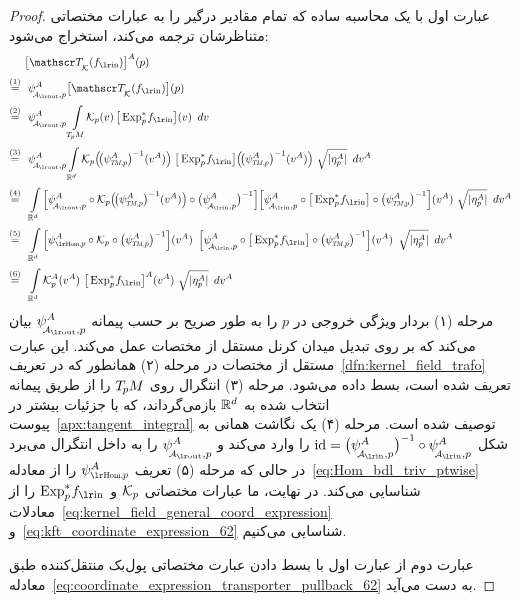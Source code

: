 \begin{proof}
    عبارت اول با یک محاسبه ساده که تمام مقادیر درگیر را به عبارات مختصاتی متناظرشان ترجمه می‌کند، استخراج می‌شود:
    \begin{align}
        & \ 
            \big[ \TK(\fin) \big]^A (p) \notag \\[.5ex]
        \overset{(1)}{=} & \ \ 
            \psiAoutp^A \big[ \TK(\fin) \big] (p) \notag \\[.5ex]
        \overset{(2)}{=} & \ \ 
            \psiAoutp^A
            \int\limits_{\TpM}\mkern-4mu
            \Kp(v) \,
            \big[\Expspfin\big] (v)
            \,\ dv
        \notag \\[.5ex]
        \overset{(3)}{=} & \ \ 
            \psiAoutp^A
            \int\limits_{\R^d}
            \Kp \pig(\! \big(\psiTMp^A\big)^{-1}(v^A) \pig) \;
            \big[\Expspfin\big] \pig(\!\big( \psiTMp^A \big)^{-1} (v^A) \pig)
            \ \sqrt{|\eta_p^A|}\,\ dv^A
        \notag \\[.5ex]
        \overset{(4)}{=} & \ \ 
            \int\limits_{\R^d}
            \Big[ \psiAoutp^A \circ
            \Kp \pig(\! \big(\psiTMp^A\big)^{-1}(v^A) \pig) \circ
            \big( \psiAinp^A \big)^{-1} \Big]
            \Big[ \psiAinp^A \circ
            \big[\Expspfin\big] \circ \big( \psiTMp^A \big)^{-1} \Big] (v^A)
            \ \sqrt{|\eta_p^A|}\,\ dv^A
        \notag \\[.5ex]
        \overset{(5)}{=} & \ \ 
            \int\limits_{\R^d}
            \Big[ \psiHomp^A \circ \Kp \circ \big(\psiTMp^A\big)^{-1} \Big] (v^A) \,\ 
            \Big[ \psiAinp^A \circ \big[\Expspfin\big] \circ \big( \psiTMp^A \big)^{-1} \Big] (v^A)
            \,\ \sqrt{|\eta_p^A|}\,\ dv^A
        \notag \\[.5ex]
        \overset{(6)}{=} & \ \ 
            \int\limits_{\R^d}
            \Kp^A (v^A) \ 
            \big[\Expspfin\big]^A (v^A)
            \ \sqrt{|\eta_p^A|}\,\ dv^A
    \end{align}
    مرحله (۱) بردار ویژگی خروجی در $p$ را به طور صریح بر حسب پیمانه $\psiAoutp^A$ بیان می‌کند که بر روی تبدیل میدان کرنل مستقل از مختصات عمل می‌کند.
    این عبارت مستقل از مختصات در مرحله (۲) همانطور که در تعریف~\ref{dfn:kernel_field_trafo} تعریف شده است، بسط داده می‌شود.
    مرحله (۳) انتگرال روی $T_{\mkern-1.5mu p}\mkern-.5muM$ را از طریق پیمانه انتخاب شده به $\mathbb{R}^d$ بازمی‌گرداند، که با جزئیات بیشتر در پیوست~\ref{apx:tangent_integral} توصیف شده است.
    مرحله (۴) یک نگاشت همانی به شکل $\id = \big(\psiAinp^A \big)^{-1} \circ \psiAinp^A$ را وارد می‌کند و $\psiAoutp^A$ را به داخل انتگرال می‌برد
    در حالی که مرحله (۵) تعریف $\psiHomp^A$ را از معادله~\eqref{eq:Hom_bdl_triv_ptwise} شناسایی می‌کند.
    در نهایت، ما عبارات مختصاتی $\mathcal{K}_p$ و $\Expspfin$ را از معادلات~\eqref{eq:kernel_field_general_coord_expression} و~\eqref{eq:kft_coordinate_expression_62} شناسایی می‌کنیم.

    عبارت دوم از عبارت اول با بسط دادن عبارت مختصاتی پول‌بک منتقل‌کننده طبق معادله~\eqref{eq:coordinate_expression_transporter_pullback_62} به دست می‌آید.
\end{proof}



